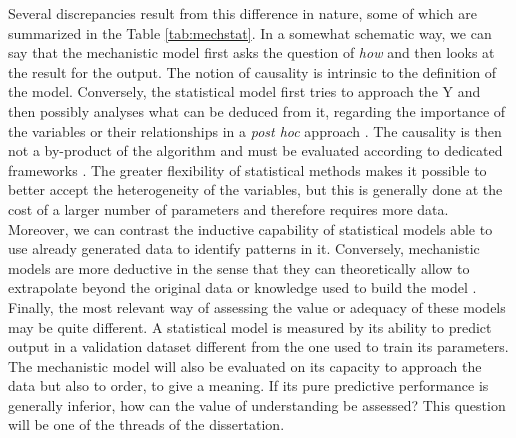\documentclass[a4paper,12pt,twoside,onecolumn,openright,final,oldfontcommands]{memoir}
\begin{document}
Several discrepancies result from this difference in nature, some of
which are summarized in the Table \ref{tab:mechstat}. In a somewhat
schematic way, we can say that the mechanistic model first asks the
question of \emph{how} and then looks at the result for the output. The
notion of causality is intrinsic to the definition of the model.
Conversely, the statistical model first tries to approach the Y and then
possibly analyses what can be deduced from it, regarding the importance
of the variables or their relationships in a \emph{post hoc} approach
\citep[\citet{manica2019toward}]{ishwaran2007variable}. The causality is
then not a by-product of the algorithm and must be evaluated according
to dedicated frameworks \citep{hernan2020causal}. The greater
flexibility of statistical methods makes it possible to better accept
the heterogeneity of the variables, but this is generally done at the
cost of a larger number of parameters and therefore requires more data.
Moreover, we can contrast the inductive capability of statistical models
able to use already generated data to identify patterns in it.
Conversely, mechanistic models are more deductive in the sense that they
can theoretically allow to extrapolate beyond the original data or
knowledge used to build the model \citep{baker2018mechanistic}. Finally,
the most relevant way of assessing the value or adequacy of these models
may be quite different. A statistical model is measured by its ability
to predict output in a validation dataset different from the one used to
train its parameters. The mechanistic model will also be evaluated on
its capacity to approach the data but also to order, to give a meaning.
If its pure predictive performance is generally inferior, how can the
value of understanding be assessed? This question will be one of the
threads of the dissertation.
\end{document}

